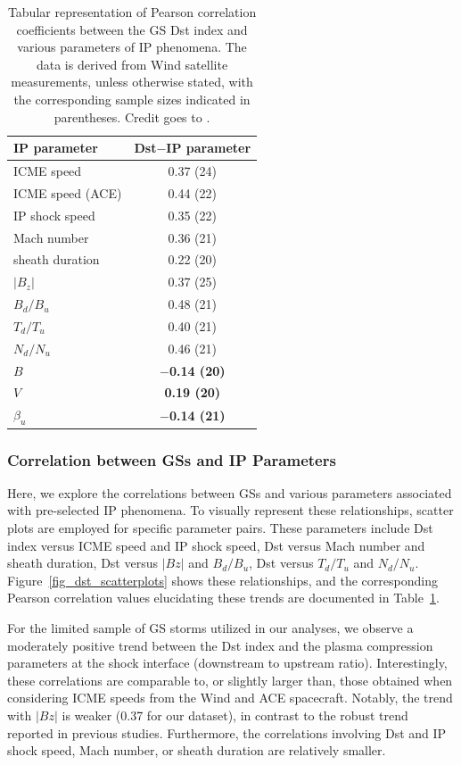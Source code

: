 \begin{table}[!htp] 
	\small
	\centering
	\caption{Tabular representation of Pearson correlation coefficients between the GS Dst index and various parameters of IP phenomena. The data is derived from Wind satellite measurements, unless otherwise stated, with the corresponding sample sizes indicated in parentheses. Credit goes to \citet{miteva_2023}.}
	\label{tab_cc_IP}
	\begin{tabular}{lc}
		\toprule
		\textbf{IP parameter} & \textbf{Dst$-$IP parameter} \\
		\midrule
		ICME speed  & 0.37 (24)	\\
		ICME speed (ACE)   & 0.44 (22)	\\
		IP shock speed  & 0.35 (22)	\\
		Mach number  & 0.36 (21)	\\ 
		sheath duration & 0.22 (20) \\
		$|B_z|$      & 0.37 (25) \\
		$B_d/B_u$  & 0.48 (21)	\\
		$T_d/T_u$  & 0.40 (21)	\\
		$N_d/N_u$  & 0.46 (21)	\\
		{\bf $B$}  & {\bf $-$0.14 (20)}  \\
		{\bf $V$}       & {\bf 0.19 (20)}	\\
		{\bf $\beta_u$} & {\bf $-$0.14 (21)}	\\
		\bottomrule
	\end{tabular}
\end{table}

\subsubsection{Correlation between GSs and IP Parameters}
Here, we explore the correlations between GSs and various parameters associated with pre-selected IP phenomena. To visually represent these relationships, scatter plots are employed for specific parameter pairs. These parameters include Dst index versus ICME speed and IP shock speed, Dst versus Mach number and sheath duration, Dst versus $|Bz|$ and $B_d/B_u$, Dst versus $T_d/T_u$ and $N_d/N_u$. Figure~\ref{fig_dst_scatterplots} shows these relationships, and the corresponding Pearson correlation values elucidating these trends are documented in Table~\ref{tab_cc_IP}.

For the limited sample of GS storms utilized in our analyses, we observe a moderately positive trend between the Dst index and the plasma compression parameters at the shock interface (downstream to upstream ratio). Interestingly, these correlations are comparable to, or slightly larger than, those obtained when considering ICME speeds from the Wind and ACE spacecraft. Notably, the trend with $|Bz|$ is weaker (0.37 for our dataset), in contrast to the robust trend reported in previous studies. Furthermore, the correlations involving Dst and IP shock speed, Mach number, or sheath duration are relatively smaller.

